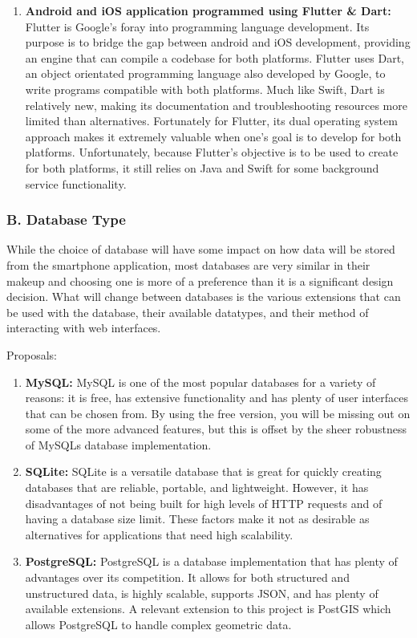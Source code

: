 \begin{enumerate}
    \item \textbf{Android and iOS application programmed using Flutter \& Dart:} Flutter is Google’s foray into programming language development. Its purpose is to bridge the gap between android and iOS development, providing an engine that can compile a codebase for both platforms. Flutter uses Dart, an object orientated programming language also developed by Google, to write programs compatible with both platforms. Much like Swift, Dart is relatively new, making its documentation and troubleshooting resources more limited than alternatives. Fortunately for Flutter, its dual operating system approach makes it extremely valuable when one’s goal is to develop for both platforms. Unfortunately, because Flutter’s objective is to be used to create for both platforms, it still relies on Java and Swift for some background service functionality.
\end{enumerate}

\subsubsection{B. Database Type}

While the choice of database will have some impact on how data will be stored from the smartphone application, most databases are very similar in their makeup and choosing one is more of a preference than it is a significant design decision. What will change between databases is the various extensions that can be used with the database, their available datatypes, and their method of interacting with web interfaces.

Proposals:

\begin{enumerate}
    \item \textbf{MySQL:} MySQL is one of the most popular databases for a variety of reasons: it is free, has extensive functionality and has plenty of user interfaces that can be chosen from. By using the free version, you will be missing out on some of the more advanced features, but this is offset by the sheer robustness of MySQLs database implementation.
    \item \textbf{SQLite:} SQLite is a versatile database that is great for quickly creating databases that are reliable, portable, and lightweight. However, it has disadvantages of not being built for high levels of HTTP requests and of having a database size limit. These factors make it not as desirable as alternatives for applications that need high scalability.
    \item \textbf{PostgreSQL:} PostgreSQL is a database implementation that has plenty of advantages over its competition. It allows for both structured and unstructured data, is highly scalable, supports JSON, and has plenty of available extensions. A relevant extension to this project is PostGIS which allows PostgreSQL to handle complex geometric data.
\end{enumerate}

